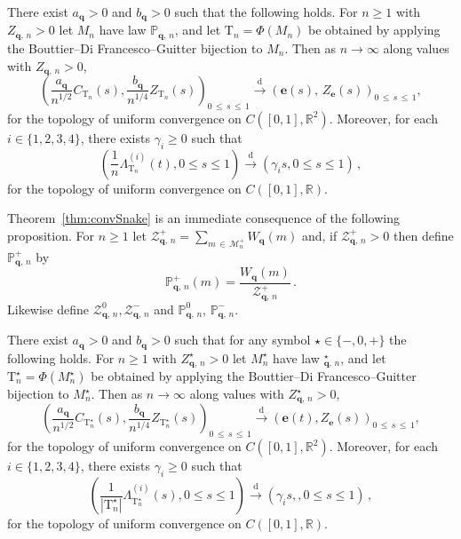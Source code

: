 \documentclass[AHL,Unicode,longabstracts,published]{cedram}
\providecommand{\R}{}
\renewcommand{\R}{\mathbb{R}}
\newcommand{\bbP}{\mathbb{P}}
\newcommand{\bfe}{\mathbf{e}}
\newcommand{\bfq}{\mathbf{q}}
\newcommand{\cM}{\mathcal{M}}
\newcommand{\cZ}{\mathcal{Z}}
\newcommand{\rT}{\mathrm{T}}
\newcommand{\convdist}{\ensuremath{\stackrel{\mathrm{d}}{\rightarrow}}}
\newcommand{\R}{\mathbb{R}}
\begin{document}
\begin{theo}\label{thm:convSnake}
There exist $a_{\bfq}>0$ and $b_{\bfq}>0$ such that the following holds. For $n \ge 1$ with $Z_{\bfq,\,n} >0$ let $M_n$ have law $\bbP_{\bfq,\,n}$, and let $\rT_n=\Phi(M_n)$ be obtained by applying the Bouttier--Di Francesco--Guitter bijection to $M_n$. Then as $n \to \infty$ along values with $Z_{\bfq,\,n} >0$,
\[
\left(\frac{a_{\bfq}}{n^{1/2}}C_{\rT_n}(s),\frac{b_{\bfq}}{n^{1/4}}Z_{\rT_n}(s)\right)_{0\,\leq\,s\,\leq\,1} \convdist \left(\bfe(s),\,Z_{\bfe}(s)\right)_{0\,\leq\,s\,\leq\,1},
\]
for the topology of uniform convergence on $C([0,1],\R^2)$. Moreover, for each $i\in\{1,2,3,4\}$, there exists $\gamma_i\geq 0$ such that
\[
\left(\frac{1}{n}\Lambda^{(i)}_{\rT_n}(t),0\leq s\leq 1\right)\convdist \left(\gamma_is,0\leq s\leq 1\right)\,,
\]
for the topology of uniform convergence on $C([0,1],\R)$.
\end{theo}

Theorem~\ref{thm:convSnake} is an immediate consequence of the following proposition. For $n \ge 1$ let $\cZ_{\bfq,\,n}^+ = \sum_{m\,\in\,\cM_n^+} W_{\bfq}(m)$ and, if $\cZ_{\bfq,\,n}^+>0$ then define $\bbP_{\bfq,\,n}^+$ by
\[
\bbP_{\bfq,\,n}^+(m) = \frac{W_{\bfq}(m)}{\cZ_{\bfq,\,n}^+}\,.
\]
Likewise define $\cZ_{\bfq,\,n}^0,\cZ_{\bfq,\,n}^-$ and $\bbP_{\bfq,\,n}^0$, $\bbP_{\bfq,\,n}^-$.

\begin{prop}\label{prop:convSnake}
There exist $a_{\bfq}>0$ and $b_{\bfq}>0$ such that for any symbol $\star \in \{-,0,+\}$ the following holds. For $n \ge 1$ with $Z_{\bfq,\,n}^\star >0$ let $M_n^\star$ have law $_{\bfq,\,n}^\star$, and let $\rT_n^\star=\Phi(M_n^\star)$ be obtained by applying the Bouttier--Di Francesco--Guitter bijection to $M_n^\star$. Then as $n \to \infty$ along values with $Z_{\bfq,\,n}^\star >0$,
\[
\left(\frac{a_{\bfq}}{n^{1/2}}C_{\rT_n^\star}(s),\frac{b_{\bfq}}{n^{1/4}}Z_{\rT_n^\star}(s)\right)_{0\,\leq\,s \,\leq\,1} \convdist (\bfe(t),Z_{\bfe}(s))_{0\,\leq\,s\,\leq \,1},
\]
for the topology of uniform convergence on $C([0,1],\R^2)$. Moreover, for each $i\in\{1,2,3,4\}$, there exists $\gamma_i\geq 0$ such that
\[
\left(\frac{1}{\left|\rT^\star_n\right|}\Lambda^{(i)}_{\rT^\star_n}(s),0\leq s\leq 1\right)\convdist\left(\gamma_is,,0\leq s\leq 1\right)\,,
\]
for the topology of uniform convergence on $C([0,1],\R)$.
\end{prop}
\end{document}
